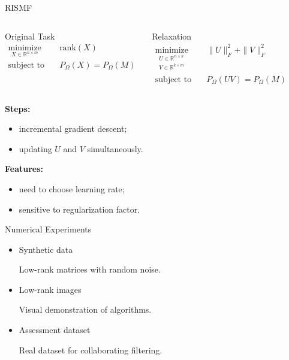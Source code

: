 \documentclass{beamer}
\begin{document}
\begin{frame}{RISMF}
	\begin{columns}[c]
		\begin{block}{Original Task}
			\vspace{-0.5cm}
			\begin{align*}
			\mathop{\text{minimize}}\limits_{X \in \mathbb{R}^{n \times m}} \quad & 
			\text{rank} (X) \\
			\text{subject to} \quad & P_{\Omega} (X) = P_{\Omega} (M)
			\end{align*}
		\end{block}
		
		\begin{block}{Relaxation}
			\vspace{-0.5cm}
			\begin{align*}
			\mathop{\text{minimize}}\limits_{\substack{	U \in \mathbb{R}^{n \times k} \\ V \in \mathbb{R}^{k \times m}}} \quad & \| U \|^2_F + \| V \|^2_F \\
			\text{subject to} \quad &  P_{\Omega} (UV) = P_{\Omega} (M) 
			\end{align*}
		\end{block}
	\end{columns}
	\vspace{0.3cm}
	\textbf{Steps:}
	\begin{itemize}
		\item incremental gradient descent;
		\item updating $U$ and $V$ simultaneously.
	\end{itemize}	
	\vspace{0.3cm}
	\textbf{Features:}
	\begin{itemize}
		\item need to choose learning rate;
		\item sensitive to regularization factor.
	\end{itemize}

\end{frame}
\begin{frame}{Numerical Experiments}
\begin{itemize}
	\item Synthetic data
	
	Low-rank matrices with random noise.
	\item Low-rank images
	
	Visual demonstration of algorithms.
	\item Assessment dataset
	
	Real dataset for collaborating filtering.
\end{itemize}

\end{frame}
\end{document}
